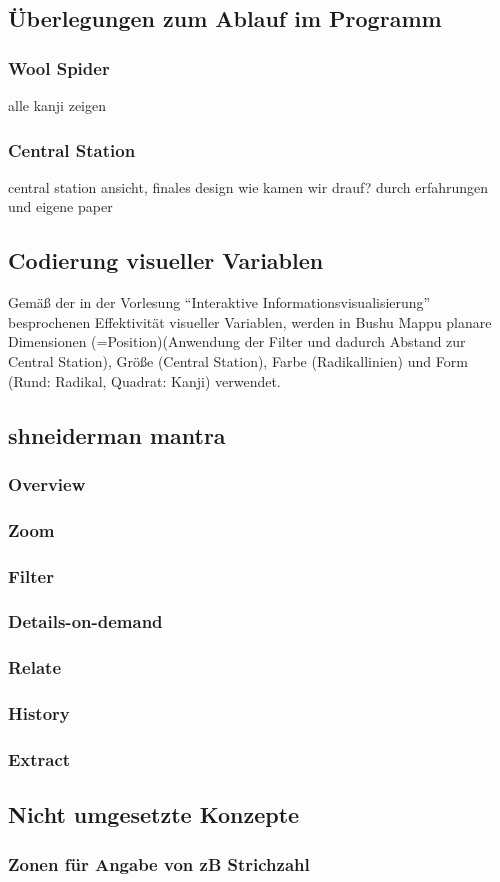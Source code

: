 \subsection{Überlegungen zum Ablauf im Programm}
\subsubsection{Wool Spider}
alle kanji zeigen

\subsubsection{Central Station}
central station ansicht, finales design
wie kamen wir drauf? durch erfahrungen und eigene paper

\subsection{Codierung visueller Variablen}
Gemäß der in der Vorlesung "`Interaktive Informationsvisualisierung"' besprochenen Effektivität visueller Variablen, werden in Bushu Mappu planare Dimensionen (=Position)(Anwendung der Filter und dadurch Abstand zur Central Station), Größe (Central Station), Farbe (Radikallinien) und Form (Rund: Radikal, Quadrat: Kanji) verwendet. 

\subsection{shneiderman mantra}
\subsubsection{Overview}
\subsubsection{Zoom}
\subsubsection{Filter}
\subsubsection{Details-on-demand}
\subsubsection{Relate}
\subsubsection{History}
\subsubsection{Extract}

\subsection{Nicht umgesetzte Konzepte}
\subsubsection{Zonen für Angabe von zB Strichzahl}